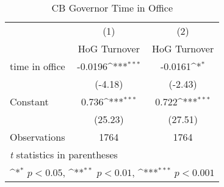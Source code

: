 \begin{table}[htbp]\centering
\def\sym#1{\ifmmode^{#1}\else\(^{#1}\)\fi}
\caption{CB Governor Time in Office \label{timeinoffHOGalone}}
\begin{tabular}{l*{2}{c}}
\toprule
                                        &\multicolumn{1}{c}{(1)}&\multicolumn{1}{c}{(2)}\\
                                        &\multicolumn{1}{c}{HoG Turnover}&\multicolumn{1}{c}{HoG Turnover}\\
\midrule
time in office                          &  -0.0196\sym{***}&  -0.0161\sym{*}  \\
                                        &  (-4.18)         &  (-2.43)         \\
\addlinespace
Constant                                &    0.736\sym{***}&    0.722\sym{***}\\
                                        &  (25.23)         &  (27.51)         \\
\midrule
Observations                            &     1764         &     1764         \\
\bottomrule
\multicolumn{3}{l}{\footnotesize \textit{t} statistics in parentheses}\\
\multicolumn{3}{l}{\footnotesize \sym{*} \(p<0.05\), \sym{**} \(p<0.01\), \sym{***} \(p<0.001\)}\\
\end{tabular}
\end{table}
